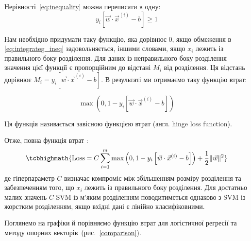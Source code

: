 \documentclass[]{article}
\begin{document}
Нерівності~\eqref{eq:inequality} можна переписати в одну:
\begin{equation}\label{eq:integrateg_ineq}
    y_i \left[ \vec{w}\cdot \vec{x}^{(i)} - b \right] \geqslant 1
\end{equation}

Нам необхідно придумати таку функцію, яка дорівнює $0$, якщо обмеження в \eqref{eq:integrateg_ineq} задовольняється, іншими словами, якщо $x_i$
лежить із правильного боку розділення. Для даних із неправильного боку розділення значення цієї функції є пропорційним до відстані $M_i$ від розділення. Ця відстань дорівнює  $M_i = y_i \left[ \vec{w}\cdot \vec{x}^{(i)} - b \right]$. В результаті ми отримаємо таку функцію втрат:

\def\mo{\max\left(0, 1 - y_i \left[ \vec{w}\cdot \vec{x}^{(i)} - b \right]\right)}
\def\mt{\max\left(0, 1 + y_i \left[ \vec{w}\cdot \vec{x}^{(i)} - b \right]\right)}

\begin{equation}
		 \mo
\end{equation}

Ця функція називається завісною функцією втрат (англ. hinge loss function).

Отже, повна функція втрат :
\begin{equation}
    \tcbhighmath{
	\mathrm{Loss} = C \sum_{i = 1}^m \mo + \frac12 \|\vec{w}\|^2
    }
\end{equation}
де гіперпараметр $C$ визначає компроміс між збільшенням розміру розділення та забезпеченням того, що $x_i$ лежить із правильного боку розділення.
Для достатньо малих значень $C$ SVM із м'яким розділенням поводитиметься однаково з SVM із жорстким розділенням, якщо вхідні дані є лінійно класифіковними.

Поглянемо на графіки й порівняємо функцію втрат для логістичної регресії та методу опорних векторів~(рис.~\ref{comparison}).
\end{document}
